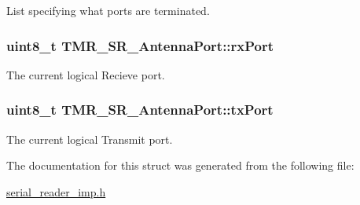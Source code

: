 List specifying what ports are terminated. \hypertarget{struct_t_m_r___s_r___antenna_port_06224a474b688f57475d8fe28f087ef3}{
\subsubsection[{rxPort}]{\setlength{\rightskip}{0pt plus 5cm}uint8\_\-t {\bf TMR\_\-SR\_\-AntennaPort::rxPort}}}
\label{struct_t_m_r___s_r___antenna_port_06224a474b688f57475d8fe28f087ef3}


The current logical Recieve port. \hypertarget{struct_t_m_r___s_r___antenna_port_77de96da6ea523147d339c3df4676d0d}{
\subsubsection[{txPort}]{\setlength{\rightskip}{0pt plus 5cm}uint8\_\-t {\bf TMR\_\-SR\_\-AntennaPort::txPort}}}
\label{struct_t_m_r___s_r___antenna_port_77de96da6ea523147d339c3df4676d0d}


The current logical Transmit port. 

The documentation for this struct was generated from the following file:\begin{CompactItemize}
\item 
\hyperlink{serial__reader__imp_8h}{serial\_\-reader\_\-imp.h}\end{CompactItemize}
